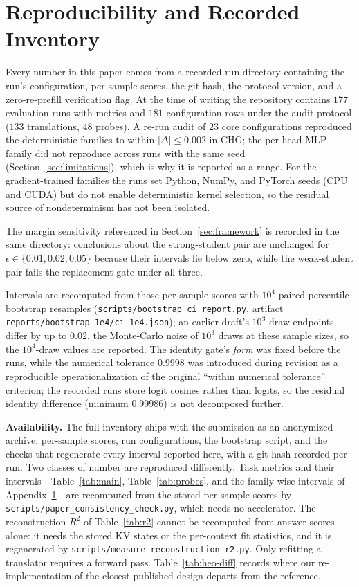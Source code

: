\documentclass[10pt]{article}
\newcommand{\kv}{\ensuremath{\mathrm{KV}}}
\begin{document}
\section{Reproducibility and Recorded Inventory}
\label{app:repro}

Every number in this paper comes from a recorded run directory containing the
run's configuration, per-sample scores, the git hash, the protocol version, and
a zero-re-prefill verification flag. At the time of writing the repository
contains $177$ evaluation runs with metrics and $181$ configuration rows under
the audit protocol ($133$ translations, $48$ probes). A re-run audit of $23$
core configurations reproduced the deterministic families to within $|\Delta|
\le 0.002$ in CHG; the per-head MLP family did not reproduce across runs with
the same seed (Section~\ref{sec:limitations}), which is why it is reported as a
range. For the gradient-trained families the runs set Python, NumPy, and PyTorch
seeds (CPU and CUDA) but do not enable deterministic kernel selection, so the
residual source of nondeterminism has not been isolated.

The margin sensitivity referenced in Section~\ref{sec:framework} is recorded in
the same directory: conclusions about the strong-student pair are unchanged for
$\epsilon\in\{0.01,0.02,0.05\}$ because their intervals lie below zero, while
the weak-student pair fails the replacement gate under all three.

Intervals are recomputed from those per-sample scores with $10^4$ paired
percentile bootstrap resamples (\texttt{scripts/bootstrap\_ci\_report.py},
artifact \texttt{reports/bootstrap\_1e4/ci\_1e4.json}); an earlier draft's
$10^3$-draw endpoints differ by up to $0.02$, the Monte-Carlo noise of $10^3$
draws at these sample sizes, so the $10^4$-draw values are reported.
The identity gate's \emph{form} was fixed before the runs, while the numerical
tolerance $0.9998$ was introduced during revision as a reproducible
operationalization of the original ``within numerical tolerance'' criterion;
the recorded runs store logit cosines rather than logits, so the residual
identity difference (minimum $0.99986$) is not decomposed further.

\textbf{Availability.} The full inventory ships with the submission as an
anonymized archive: per-sample scores, run configurations, the bootstrap script,
and the checks that regenerate every interval reported here, with a git hash
recorded per run. Two classes of number are reproduced differently. Task metrics
and their intervals---Table~\ref{tab:main}, Table~\ref{tab:probes}, and the
family-wise intervals of Appendix~\ref{app:repro}---are recomputed from the
stored per-sample scores by \texttt{scripts/paper\_consistency\_check.py}, which
needs no accelerator. The reconstruction $R^2$ of Table~\ref{tab:r2} cannot be
recomputed from answer scores alone: it needs the stored \kv{} states or the
per-context fit statistics, and it is regenerated by
\texttt{scripts/measure\_reconstruction\_r2.py}. Only refitting a translator
requires a forward pass. Table~\ref{tab:heo-diff} records where our
re-implementation of the closest published design departs from the reference.
\end{document}

